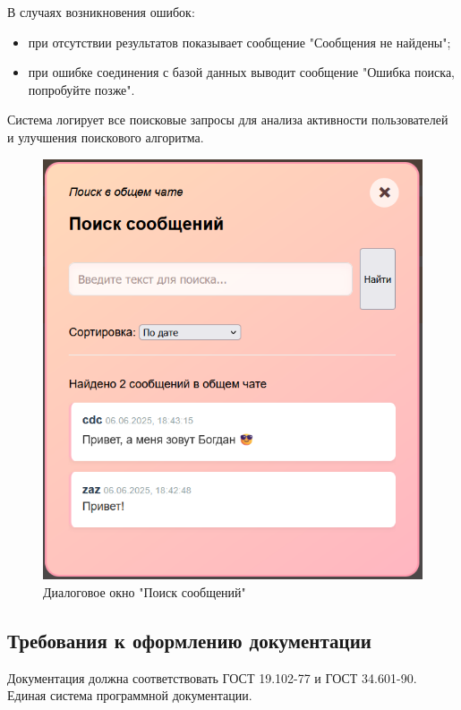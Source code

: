 В случаях возникновения ошибок:
\begin{itemize}
	\item при отсутствии результатов показывает сообщение "Сообщения не найдены";
	\item при ошибке соединения с базой данных выводит сообщение "Ошибка поиска, попробуйте позже".
\end{itemize}

Система логирует все поисковые запросы для анализа активности пользователей и улучшения поискового алгоритма.

\begin{figure}[h!]
	\centering
	\includegraphics[width=0.8\linewidth]{"images/Окно поиска по сообщениям"}
	\caption{Диалоговое окно "Поиск сообщений"}
	\label{fig:search}
\end{figure}

\subsection{Требования к оформлению документации}

Документация должна соответствовать ГОСТ 19.102-77 и ГОСТ 34.601-90. Единая система программной документации.